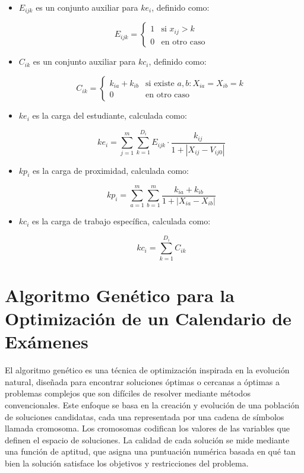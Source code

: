 \documentclass{article}
\begin{document}
\begin{itemize}
\item $E_{ijk}$ es un conjunto auxiliar para $ke_i$, definido como:

\[
E_{ijk} = 
\begin{cases} 
1 & \text{si } x_{ij} > k \\
0 & \text{en otro caso}
\end{cases}
\]

\item $C_{ik}$ es un conjunto auxiliar para $kc_i$, definido como:

\[
C_{ik} = 
\begin{cases} 
k_{ia} + k_{ib} & \text{si existe } a, b : X_{ia} = X_{ib} = k \\
0 & \text{en otro caso}
\end{cases}
\]

\item $ke_i$ es la carga del estudiante, calculada como:

\[
ke_i = \sum_{j=1}^{m} \sum_{k=1}^{D_i} E_{ijk} \cdot \frac{k_{ij}}{1 + |X_{ij} - V_{ij0}|}
\]

\item $kp_i$ es la carga de proximidad, calculada como:

\[
kp_i = \sum_{a=1}^{m} \sum_{b=1}^{m} \frac{k_{ia} + k_{ib}}{1 + |X_{ia} - X_{ib}|}
\]

\item $kc_i$ es la carga de trabajo específica, calculada como:

\[
kc_i = \sum_{k=1}^{D_i} C_{ik}
\]

\end{itemize}
\section{Algoritmo Genético para la Optimización de un Calendario de Exámenes}

El algoritmo genético es una técnica de optimización inspirada en la evolución natural, diseñada para encontrar soluciones óptimas o cercanas a óptimas a problemas complejos que son difíciles de resolver mediante métodos convencionales. Este enfoque se basa en la creación y evolución de una población de soluciones candidatas, cada una representada por una cadena de símbolos llamada cromosoma. Los cromosomas codifican los valores de las variables que definen el espacio de soluciones. La calidad de cada solución se mide mediante una función de aptitud, que asigna una puntuación numérica basada en qué tan bien la solución satisface los objetivos y restricciones del problema.
\end{document}

